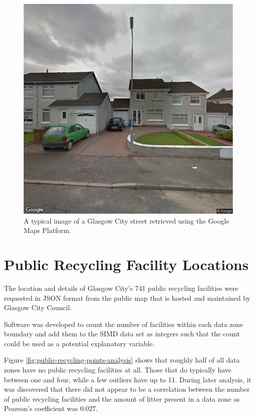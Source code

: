 \documentclass{thesis}
\begin{document}
\begin{figure}[h]
    \centering
    \includegraphics[scale=0.4]{images/street-view-image.jpg}
    \caption{A typical image of a Glasgow City street retrieved using the Google Maps Platform.}
    \label{fig:street-view-image}
\end{figure}

\section{Public Recycling Facility Locations}

The location and details of Glasgow City's 741 public recycling facilities were requested in JSON format from the public map that is hosted and maintained by Glasgow City Council.

Software was developed to count the number of facilities within each data zone boundary and add them to the SIMD data set as integers such that the count could be used as a potential explanatory variable.

Figure \ref{fig:public-recycling-points-analysis} shows that roughly half of all data zones have no public recycling facilities at all. Those that do typically have between one and four, while a few outliers have up to 11. During later analysis, it was discovered that there did not appear to be a correlation between the number of public recycling facilities and the amount of litter present in a data zone as Pearson's coefficient was 0.027.
\end{document}
